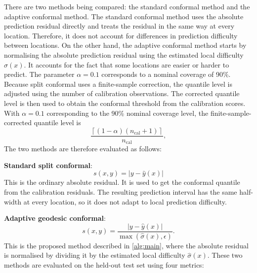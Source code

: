 \documentclass[11pt,a4paper]{report}
\begin{document}
There are two methods being compared: the standard conformal method and the adaptive conformal method. The standard conformal method uses the absolute prediction residual directly and treats the residual in the same way at every location. Therefore, it does not account for differences in prediction difficulty between locations. On the other hand, the adaptive conformal method starts by normalising the absolute prediction residual using the estimated local difficulty $\hat{\sigma}(x)$. It accounts for the fact that some locations are easier or harder to predict. The parameter $\alpha=0.1$ corresponds to a nominal coverage of 90\%. Because split conformal uses a finite-sample correction, the quantile level is adjusted using the number of calibration observations. The corrected quantile level is then used to obtain the conformal threshold from the calibration scores. With $\alpha=0.1$ corresponding to the 90\% nominal coverage level, the finite-sample-corrected quantile level is
\begin{equation}
\frac{\left\lceil(1-\alpha)(n_{\mathrm{cal}}+1)\right\rceil}
{n_{\mathrm{cal}}},
\end{equation}
The two methods are therefore evaluated as follows:

\textbf{Standard split conformal}:  
 \begin{equation}
s(x,y)=|y-\hat y(x)|
\end{equation}
This is the ordinary absolute residual. It is used to get the conformal quantile from the calibration residuals. The resulting prediction interval has the same half-width at every location, so it does not adapt to local prediction difficulty. 

\textbf{Adaptive geodesic conformal}: 
\begin{equation}
s(x,y)
=
\frac{|y-\hat{y}(x)|}
{\max\left(\hat{\sigma}(x),\epsilon\right)}.
\end{equation}
This is the proposed method described in \cref{alg:main}, where the absolute residual is normalised by dividing it by the estimated local difficulty $\hat\sigma(x)$. These two methods are evaluated on the held-out test set using four metrics:
\end{document}
